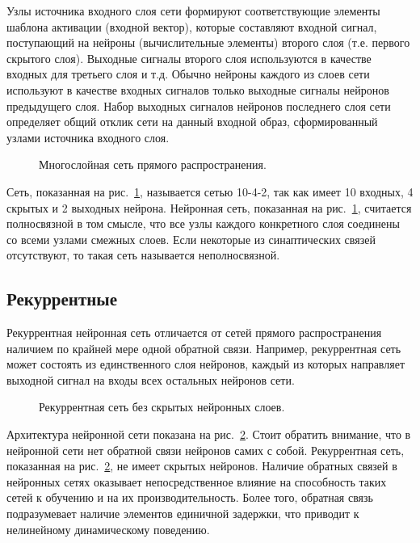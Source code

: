 Узлы источника входного слоя сети формируют соответствующие элементы шаблона активации (входной  вектор), которые составляют входной сигнал, поступающий на нейроны (вычислительные элементы) второго слоя (т.е. первого скрытого слоя).
Выходные сигналы второго слоя используются в качестве входных для третьего слоя и т.д.
Обычно нейроны каждого из слоев сети используют в качестве входных сигналов только выходные сигналы нейронов предыдущего слоя.
Набор выходных сигналов нейронов последнего слоя сети определяет общий отклик сети на данный входной образ, сформированный узлами источника входного слоя.

\begin{figure}[h]
\caption{Многослойная сеть прямого распространения.}
\label{ris:ManyLayer}
\end{figure}

Сеть, показанная на рис.~\ref{ris:ManyLayer}, называется сетью 10-4-2, так как имеет 10 входных, 4 скрытых и 2 выходных нейрона.
Нейронная сеть, показанная на рис.~\ref{ris:ManyLayer}, считается полносвязной в том смысле, что все узлы каждого конкретного слоя соединены со всеми узлами смежных слоев.
Если некоторые из синаптических связей отсутствуют, то такая сеть называется неполносвязной.\cite{NejronnyeSeti}

\subsection{Рекуррентные}
Рекуррентная нейронная сеть отличается от сетей прямого распространения наличием по крайней мере одной обратной связи.
Например, рекуррентная сеть может состоять из единственного слоя нейронов, каждый из которых направляет выходной сигнал на входы всех остальных нейронов сети.

\begin{figure}[h]
\caption{Рекуррентная сеть без скрытых нейронных слоев.}
\label{ris:Recurrent}
\end{figure}

Архитектура нейронной сети показана на рис.~\ref{ris:Recurrent}.
Стоит обратить внимание, что в нейронной сети нет обратной связи нейронов самих с собой.
Рекуррентная сеть, показанная на рис.~\ref{ris:Recurrent}, не имеет скрытых нейронов.
Наличие обратных связей в нейронных сетях оказывает непосредственное влияние на способность таких сетей к обучению и на их производительность.
Более того, обратная связь подразумевает наличие элементов единичной задержки, что приводит к нелинейному динамическому поведению.\cite{NejronnyeSeti}